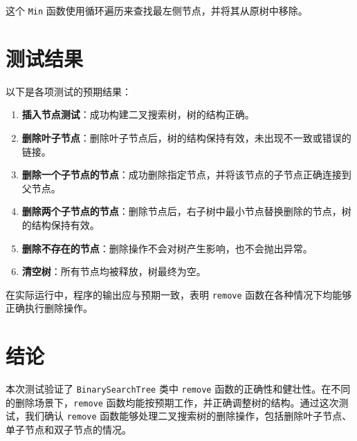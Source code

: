 \documentclass[UTF8]{ctexart}
\begin{document}
这个 \texttt{Min} 函数使用循环遍历来查找最左侧节点，并将其从原树中移除。

\section{测试结果}

以下是各项测试的预期结果：

\begin{enumerate}
    \item \textbf{插入节点测试}：成功构建二叉搜索树，树的结构正确。
    \item \textbf{删除叶子节点}：删除叶子节点后，树的结构保持有效，未出现不一致或错误的链接。
    \item \textbf{删除一个子节点的节点}：成功删除指定节点，并将该节点的子节点正确连接到父节点。
    \item \textbf{删除两个子节点的节点}：删除节点后，右子树中最小节点替换删除的节点，树的结构保持有效。
    \item \textbf{删除不存在的节点}：删除操作不会对树产生影响，也不会抛出异常。
    \item \textbf{清空树}：所有节点均被释放，树最终为空。
\end{enumerate}

在实际运行中，程序的输出应与预期一致，表明 \texttt{remove} 函数在各种情况下均能够正确执行删除操作。

\section{结论}

本次测试验证了 \texttt{BinarySearchTree} 类中 \texttt{remove} 函数的正确性和健壮性。在不同的删除场景下，\texttt{remove} 函数均能按预期工作，并正确调整树的结构。通过这次测试，我们确认 \texttt{remove} 函数能够处理二叉搜索树的删除操作，包括删除叶子节点、单子节点和双子节点的情况。
\end{document}
